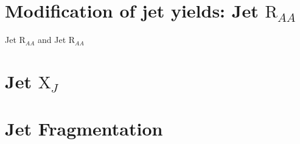 %


























\section{Modification of jet yields: {\textsc Jet $\mathrm{R}_{AA}$} }
{\textsc Jet $\mathrm{R}_{AA}$} and {Jet $\mathrm{R}_{AA}$}

%





\section{Jet $\mathrm{X}_{J}$}
\section{Jet Fragmentation}



